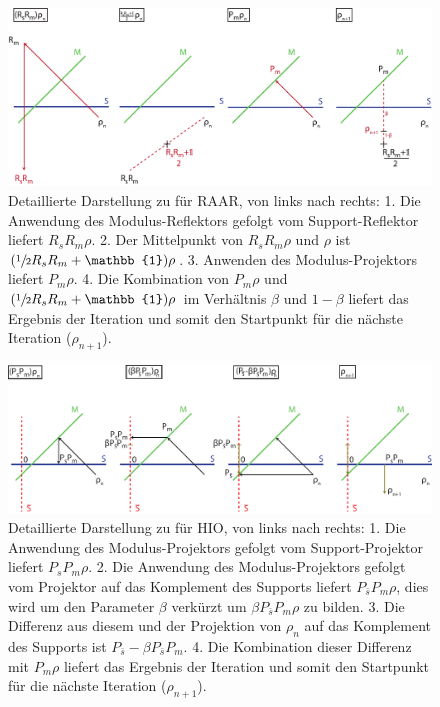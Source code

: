 \begin{figure}
	\centering
	\includegraphics[width=1\textwidth]{images/raar.pdf}
	\caption[Details zu RAAR]{Detaillierte Darstellung zu  für RAAR, von links nach rechts: 1. Die Anwendung des Modulus-Reflektors gefolgt vom Support-Reflektor liefert $R_sR_m\rho$. 2. Der Mittelpunkt von $R_sR_m\rho$ und $\rho$ ist $(\sfrac{1}{2}R_sR_m+\mathbb{1})\rho$. 3. Anwenden des Modulus-Projektors liefert $P_m\rho$. 4. Die Kombination von $P_m\rho$ und $(\sfrac{1}{2}R_sR_m+\mathbb{1})\rho$ im Verhältnis $\beta$ und $1-\beta$ liefert das Ergebnis der Iteration  und somit den Startpunkt für die nächste Iteration ($\rho_{n+1}$).}
	\label{fig:raar}
\end{figure} 	

\begin{figure}
	\centering
	\includegraphics[width=1\textwidth]{images/hio.pdf}
	\caption[Details zu HIO]{Detaillierte Darstellung zu  für HIO, von links nach rechts: 1. Die Anwendung des Modulus-Projektors gefolgt vom Support-Projektor liefert $P_sP_m\rho$. 2. Die Anwendung des Modulus-Projektors gefolgt vom Projektor auf das Komplement des Supports liefert  $P_{\bar{s}}P_m\rho$, dies wird um den Parameter $\beta$ verkürzt um $\beta P_{\bar{s}}P_m\rho$ zu bilden. 3. Die Differenz aus diesem und der Projektion von $\rho_n$ auf das Komplement des Supports ist $P_{\bar{s}}-\beta P_{\bar{s}}P_m$. 4. Die Kombination dieser Differenz mit $P_m\rho$ liefert das Ergebnis der Iteration und somit den Startpunkt für die nächste Iteration ($\rho_{n+1}$).}
	\label{fig:hio}
\end{figure} 	
